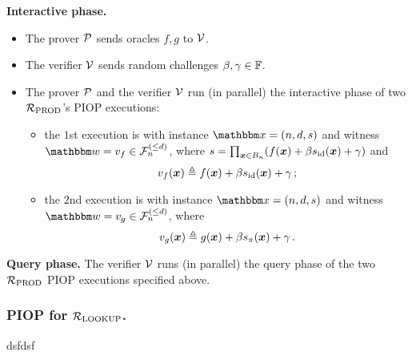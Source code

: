\textbf{Interactive phase.} 
\begin{itemize}
    \item The prover $\mathcal{P}$ sends oracles $f, g$ to $\mathcal{V}$.
    \item The verifier $\mathcal{V}$ sends random challenges $\beta, \gamma \in \mathbb{F}$.
    \item The prover $\mathcal{P}$ and the verifier $\mathcal{V}$ run (in parallel) the interactive phase 
    of two ${\mathcal{R}}_{\text{PROD}}$'s PIOP executions:
        \begin{itemize}
            \item the $1$st execution is with instance $\instR = (n, d, s)$ and
                witness $\witR = v_{f} \in \bdp{n}{d}$, where 
                $
                    s = \prod_{\boldsymbol{x}\in B_{n}} (f(\boldsymbol{x}) + \beta s_{\text{id}}(\boldsymbol{x}) + \gamma)
                $ and
                \[
                    v_{f}(\boldsymbol{x}) \mathrel{\triangleq} f(\boldsymbol{x}) + \beta s_{\text{id}}(\boldsymbol{x}) + \gamma \,;
                \]
            \item the $2$nd execution is with instance $\instR = (n, d, s)$ and 
                witness $\witR = v_{g} \in \bdp{n}{d}$, where 
                \[
                    v_{g}(\boldsymbol{x}) \mathrel{\triangleq} g(\boldsymbol{x}) + \beta s_{\pi}(\boldsymbol{x}) + \gamma \,.
                \]
        \end{itemize}
\end{itemize}

\textbf{Query phase.}
The verifier $\mathcal{V}$ runs (in parallel) the query phase of the two ${\mathcal{R}}_{\text{PROD}}$ PIOP 
executions specified above.

\subsubsection*{PIOP for ${\mathcal{R}}_{\text{LOOKUP}}$.} 
dsfdsf
